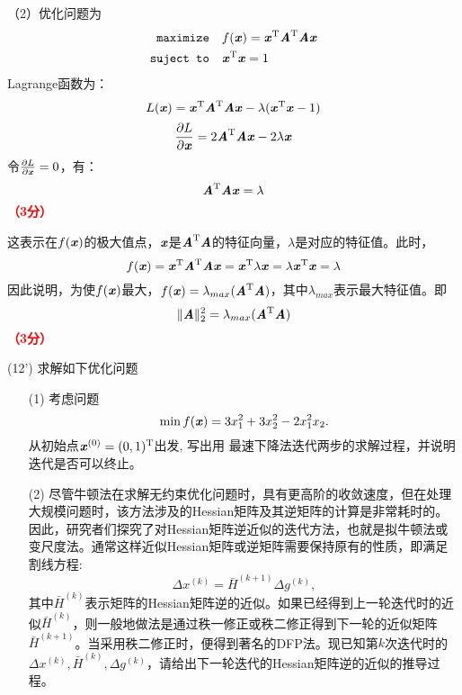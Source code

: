 \documentclass[12pt,a4paper,openany,twoside]{ctexbook}
\begin{document}
\begin{Solution}
	（2）优化问题为\[ 	\begin{aligned}
		\texttt{maximize} \quad & f(\Vx)=\Vx\T\MA\T\MA\Vx \\
		\texttt{suject to} \quad & \Vx\T\Vx=1
	\end{aligned} \]
	Lagrange函数为：
	\[ L(\Vx)=\Vx\T\MA\T\MA\Vx-\lambda(\Vx\T\Vx-1) \]
	\[ \frac{\partial L}{\partial \Vx}= 2\MA\T\MA\Vx -2\lambda\Vx\]
	令$ \frac{\partial L}{\partial \Vx}=0 $，有：
	\[ \MA\T\MA\Vx =\lambda \]
	\hfill \textcolor{red}{\textbf{（3分）}}
	
	这表示在$ f(\Vx) $的极大值点，$ \Vx $是$ \MA\T\MA $的特征向量，$ \lambda $是对应的特征值。此时，\[  f(\Vx)=\Vx\T\MA\T\MA\Vx=\Vx\T\lambda\Vx=\lambda\Vx\T\Vx=\lambda  \]
	因此说明，为使$ f(\Vx) $最大，$ f(\Vx)=\lambda_{max}(\MA\T\MA) $，其中$ \lambda_{max} $表示最大特征值。即
	\[ \Vert\MA\Vert_{2}^2=\lambda_{max}(\MA\T\MA) \]
	\hfill \textcolor{red}{\textbf{（3分）}}
\end{Solution}

\begin{exercise}(12')
	求解如下优化问题
	\begin{itemize}
		\item [(1)] 考虑问题
		$$
		\min f(\Vx)=3 x_1^2+3 x_2^2-2x_1^2 x_2 .
		$$
		从初始点$\Vx^{(0)}=(0,1)^{\mathrm{T}}$出发, 写出用 最速下降法迭代两步的求解过程，并说明迭代是否可以终止。
		\item[(2)] 尽管牛顿法在求解无约束优化问题时，具有更高阶的收敛速度，但在处理大规模问题时，该方法涉及的Hessian矩阵及其逆矩阵的计算是非常耗时的。因此，研究者们探究了对Hessian矩阵逆近似的迭代方法，也就是拟牛顿法或变尺度法。通常这样近似Hessian矩阵或逆矩阵需要保持原有的性质，即满足割线方程:
		$$\Delta x^{(k)} = \bar{H}^{(k+1)} \Delta g^{(k)},$$
		其中$\bar{H}^{(k)}$表示矩阵的Hessian矩阵逆的近似。如果已经得到上一轮迭代时的近似$\bar{H}^{(k)}$，则一般地做法是通过秩一修正或秩二修正得到下一轮的近似矩阵$\bar{H}^{(k+1)}$。当采用秩二修正时，便得到著名的DFP法。现已知第$k$次迭代时的$\Delta x^{(k)}, \bar{H}^{(k)}, \Delta g^{(k)}$，请给出下一轮迭代的Hessian矩阵逆的近似的推导过程。
	\end{itemize}
\end{exercise}
\end{document}
